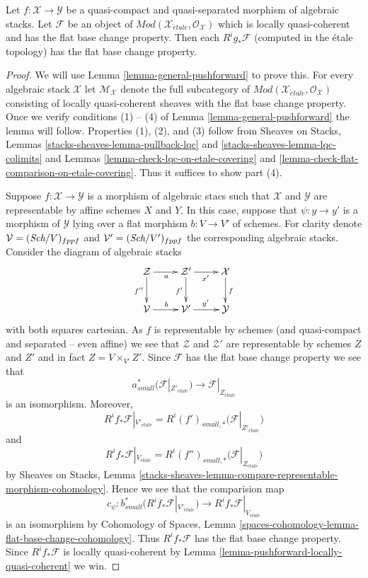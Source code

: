 \begin{lemma}
\label{lemma-flat-comparison}
Let $f : \mathcal{X} \to \mathcal{Y}$ be a quasi-compact and
quasi-separated morphism of algebraic stacks. Let 
$\mathcal{F}$ be an object of
$\textit{Mod}(\mathcal{X}_{\acute{e}tale}, \mathcal{O}_\mathcal{X})$
which is locally quasi-coherent and has the flat base change property.
Then each $R^ig_*\mathcal{F}$ (computed in the \'etale topology)
has the flat base change property.
\end{lemma}

\begin{proof}
We will use
Lemma \ref{lemma-general-pushforward}
to prove this. For every algebraic stack $\mathcal{X}$ let
$\mathcal{M}_\mathcal{X}$ denote the full subcategory of
$\textit{Mod}(\mathcal{X}_{\acute{e}tale}, \mathcal{O}_\mathcal{X})$
consisting of locally quasi-coherent sheaves with the flat base
change property. Once we verify conditions (1) -- (4) of
Lemma \ref{lemma-general-pushforward}
the lemma will follow. Properties (1), (2), and (3) follow from
Sheaves on Stacks, Lemmas \ref{stacks-sheaves-lemma-pullback-lqc} and
\ref{stacks-sheaves-lemma-lqc-colimits}
and
Lemmas \ref{lemma-check-lqc-on-etale-covering} and
\ref{lemma-check-flat-comparison-on-etale-covering}.
Thus it suffices to show part (4).

\medskip\noindent
Suppose $f : \mathcal{X} \to \mathcal{Y}$ is a morphism of algebraic stacs
such that $\mathcal{X}$ and $\mathcal{Y}$ are representable by affine
schemes $X$ and $Y$. In this case, suppose that
$\psi : y \to y'$ is a morphism of $\mathcal{Y}$ lying over
a flat morphism $b : V \to V'$ of schemes. For clarity denote
$\mathcal{V} = (\textit{Sch}/V)_{fppf}$ and $\mathcal{V}' = (\textit{Sch}/V')_{fppf}$
the corresponding algebraic stacks. Consider the diagram
of algebraic stacks
$$
\xymatrix{
\mathcal{Z} \ar[d]_{f''} \ar[r]_a &
\mathcal{Z}' \ar[r]_{x'} \ar[d]_{f'} & \mathcal{X} \ar[d]^f \\
\mathcal{V} \ar[r]^b & \mathcal{V}' \ar[r]^{y'} & \mathcal{Y}
}
$$
with both squares cartesian. As $f$ is representable by schemes
(and quasi-compact and separated -- even affine) we see that $\mathcal{Z}$ and
$\mathcal{Z}'$ are representable by schemes $Z$ and $Z'$ and in
fact $Z = V \times_{V'} Z'$. Since $\mathcal{F}$ has the flat
base change property we see that
$$
a_{small}^*\big(\mathcal{F}|_{Z'_{\acute{e}tale}}\big)
\longrightarrow
\mathcal{F}|_{Z_{\acute{e}tale}}
$$
is an isomorphism. Moreover,
$$
R^if_*\mathcal{F}|_{V'_{\acute{e}tale}} =
R^i(f')_{small, *}\big(\mathcal{F}|_{Z'_{\acute{e}tale}}\big)
$$
and
$$
R^if_*\mathcal{F}|_{V_{\acute{e}tale}} =
R^i(f'')_{small, *}\big(\mathcal{F}|_{Z_{\acute{e}tale}}\big)
$$
by
Sheaves on Stacks, Lemma
\ref{stacks-sheaves-lemma-compare-representable-morphism-cohomology}.
Hence we see that the comparision map
$$
c_\psi :
b_{small}^*(R^if_*\mathcal{F}|_{V'_{\acute{e}tale}})
\longrightarrow
R^if_*\mathcal{F}|_{V_{\acute{e}tale}}
$$
is an isomorphism by
Cohomology of Spaces, Lemma
\ref{spaces-cohomology-lemma-flat-base-change-cohomology}.
Thus $R^if_*\mathcal{F}$ has the flat base change property.
Since $R^if_*\mathcal{F}$ is locally quasi-coherent by
Lemma \ref{lemma-pushforward-locally-quasi-coherent}
we win.
\end{proof}

